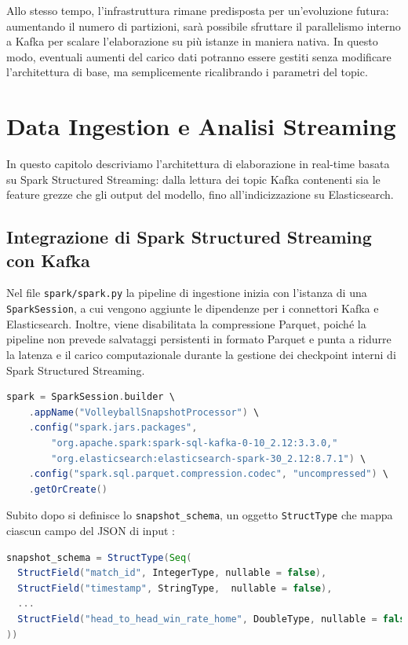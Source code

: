 \documentclass[a4paper,12pt]{report}
\begin{document}
Allo stesso tempo, l’infrastruttura rimane predisposta per un’evoluzione futura: aumentando il numero di partizioni, sarà possibile sfruttare il parallelismo interno a Kafka per scalare l’elaborazione su più istanze in maniera nativa. In questo modo, eventuali aumenti del carico dati potranno essere gestiti senza modificare l’architettura di base, ma semplicemente ricalibrando i parametri del topic.





\chapter{Data Ingestion e Analisi Streaming}

In questo capitolo descriviamo l’architettura di elaborazione in real-time basata su Spark Structured Streaming: dalla lettura dei topic Kafka contenenti sia le feature grezze che gli output del modello, fino all’indicizzazione su Elasticsearch.

\section{Integrazione di Spark Structured Streaming con Kafka}

Nel file \texttt{spark/spark.py} la pipeline di ingestione inizia con l’istanza di una \texttt{SparkSession}, a cui vengono aggiunte le dipendenze per i connettori Kafka e Elasticsearch. Inoltre, viene disabilitata la compressione Parquet, poiché la pipeline non prevede salvataggi persistenti in formato Parquet e punta a ridurre la latenza e il carico computazionale durante la gestione dei checkpoint interni di Spark Structured Streaming.

\begin{lstlisting}[language=Scala]
spark = SparkSession.builder \
    .appName("VolleyballSnapshotProcessor") \
    .config("spark.jars.packages",
        "org.apache.spark:spark-sql-kafka-0-10_2.12:3.3.0,"
        "org.elasticsearch:elasticsearch-spark-30_2.12:8.7.1") \
    .config("spark.sql.parquet.compression.codec", "uncompressed") \
    .getOrCreate()
\end{lstlisting}

Subito dopo si definisce lo \texttt{snapshot\_schema}, un oggetto \texttt{StructType} che mappa ciascun campo del JSON di input :

\begin{lstlisting}[language=Scala]
snapshot_schema = StructType(Seq(
  StructField("match_id", IntegerType, nullable = false),
  StructField("timestamp", StringType,  nullable = false),
  ...
  StructField("head_to_head_win_rate_home", DoubleType, nullable = false)
))
\end{lstlisting}
\end{document}
